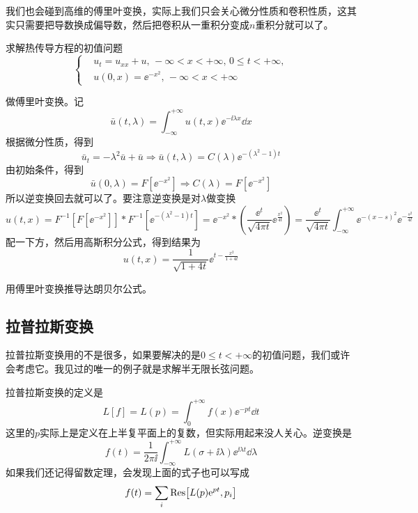 我们也会碰到高维的傅里叶变换，实际上我们只会关心微分性质和卷积性质，这其实只需要把导数换成偏导数，然后把卷积从一重积分变成$n$重积分就可以了。
\begin{problembox}
    \begin{example}
        求解热传导方程的初值问题
        \begin{equation*}
            \left\{
                \begin{aligned}
                    &u_t = u_{xx} + u,\, -\infty < x < +\infty,\, 0 \leq t < +\infty,\\
                    &u(0, x) = \ee^{-x^2},\, -\infty < x < +\infty
                \end{aligned}
            \right.
        \end{equation*}
    \end{example}
    \begin{solution}
        做傅里叶变换。记
        \[\bar{u}(t, \lambda) = \int_{-\infty}^{+\infty} u(t, x) \ee^{- \ii \lambda x} \dd{x}\]
        根据微分性质，得到
        \[\bar{u}_t = -\lambda^2 \bar{u} + \bar{u} \Rightarrow \bar{u}(t, \lambda) = C(\lambda) \ee^{-\left(\lambda^2 - 1\right)t}\]
        由初始条件，得到
        \[\bar{u}(0, \lambda) = F[\ee^{-x^2}] \Rightarrow C(\lambda) = F[\ee^{-x^2}]\]
        所以逆变换回去就可以了。要注意逆变换是对$\lambda$做变换
        \[u(t, x) = F^{-1}\left[F[\ee^{-x^2}]\right] * F^{-1}[\ee^{-\left(\lambda^2 - 1\right)t}] = \ee^{-x^2} * \left(\frac{\ee^t}{\sqrt{4 \pi t}} \ee^{\frac{x^2}{4t}}\right) = \frac{\ee^{t}}{\sqrt{4 \pi t}}\int_{-\infty}^{+\infty} \ee^{-\left(x - s\right)^2} \ee^{-\frac{s^2}{4t}}\]
        配一下方，然后用高斯积分公式，得到结果为
        \[u(t, x) = \frac{1}{\sqrt{1 + 4t}} \ee^{t - \frac{x^2}{1 + 4t}}\]
    \end{solution}
\end{problembox}
\begin{problembox}
    \begin{exercise}
        用傅里叶变换推导达朗贝尔公式。
    \end{exercise}
\end{problembox}

\subsection{拉普拉斯变换}
拉普拉斯变换用的不是很多，如果要解决的是$0 \leq t < +\infty$的初值问题，我们或许会考虑它。我见过的唯一的例子就是求解半无限长弦问题。

拉普拉斯变换的定义是
\[L[f] = L(p) = \int_{0}^{+\infty} f(x) \ee^{-p t} \dd{t}\]
这里的$p$实际上是定义在上半复平面上的复数，但实际用起来没人关心。逆变换是
\[f(t) = \frac{1}{2 \pi \ii} \int_{-\infty}^{+\infty} L(\sigma + \ii \lambda) \ee^{\ii \lambda t} \dd{\lambda}\]
如果我们还记得留数定理，会发现上面的式子也可以写成
\[f(t) = \sum_i \Res[L(p) \ee^{p t}, p_i]\]

